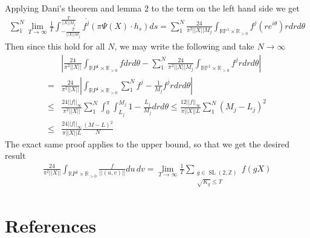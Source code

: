 \documentclass{article}
\newcommand{\abs}[1]{\left\vert#1\right\vert}
\newcommand{\norm}[1]{\lvert\lvert#1\rvert\rvert}
\newcommand{\slz}{\operatorname{SL}(2,\mathbb{Z})}
\begin{document}
        Applying Dani's theorem and lemma 2 to the term on the left hand side we get
        \begin{align*}
            \sum_1^N\lim_{T \to \infty} \frac{1}{T} \int_{-\frac{T}{\norm{X}M_j}}^{\frac{T}{\norm{X}M_j}}\overline{f^j}(\pi \Psi(X)\cdot h_s)ds = \sum_1^N\frac{24}{\pi^2\norm{X}M_j}\int_{\mathbb{RP}^1 \times \mathbb{R}_{>0}}f^j(re^{i\theta})rdrd\theta
        \end{align*}
        Then since this hold for all \(N\), we may write the following and take \(N \to \infty\)
        \begin{align*}
            &\abs{\frac{24}{\pi^2\norm{X}}\int_{\mathbb{R}P^1\times{\mathbb{R}_{>0}}}fdrd\theta - \sum_1^N\frac{24}{\pi^2\norm{X}M_j}\int_{\mathbb{RP}^1 \times \mathbb{R}_{>0}}f^jrdrd\theta}\\
            = &\frac{24}{\pi^2\norm{X}}\abs{\int_{\mathbb{R}P^1\times{\mathbb{R}_{>0}}}\sum_1^N f^j - \frac{1}{M_j}f^jrdrd\theta}\\
            \leq &\frac{24\norm{f}_\infty}{\pi^2\norm{X}}\sum_1^N\int_0^{\pi}\int_{L_j}^{M_j}1 - \frac{L_j}{M_j}drd\theta \leq \frac{12\norm{f}_\infty}{\pi\norm{X}L}\sum_1^N(M_j - L_j)^2 \\
            \leq &\frac{24\norm{f}_\infty}{\pi\norm{X}L}\frac{(M-L)^2}{N}
        \end{align*}
        The exact same proof applies to the upper bound, so that we get the desired result
        \begin{align*}
            \frac{24}{\pi^2\norm{X}}\int_{\mathbb{R}P^1\times{\mathbb{R}_{>0}}}\frac{f}{\norm{(u,v)}}du\,dv = \lim_{T\to\infty}\frac{1}{T}\sum_{\substack{g \in \slz \\ \sqrt{K_g} \leq T}}f(g X)
        \end{align*}

        \section{References}

        \printbibliography
\end{document}
